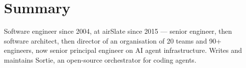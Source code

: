 %

\section{Summary}

Software engineer since 2004, at airSlate since 2015 --- senior engineer, then
software architect, then director of an organisation of 20 teams and 90+ engineers,
now senior principal engineer on AI agent infrastructure. Writes and maintains Sortie,
an open-source orchestrator for coding agents.
